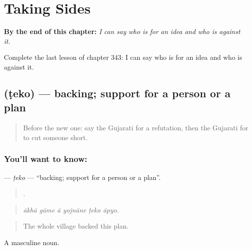 
\chapter{Taking Sides}
\label{ch:gu-taking-sides}

\begin{chapteropening}
\textbf{By the end of this chapter:} \emph{I can say who is for an idea and who is against it.}

Complete the last lesson of chapter 343: I can say who is for an idea and who is against it.
\end{chapteropening}

\section[\texorpdfstring{\gu{ટેકો} (ṭeko)}{ટેકો (ṭeko)}]{ (ṭeko) — backing; support for a person or a plan}

\label{lesson:GU-C343-teko}



\begin{quote}
Before the new one: say the Gujarati for a refutation, then the Gujarati for to cut someone short.
\end{quote}

\subsection*{You'll want to know: }
\textbf{} — \emph{ṭeko} — \textquotedblleft{}backing; support for a person or a plan\textquotedblright{}.

\begin{quote}
     .
\end{quote}

\begin{quote}
\emph{ākhā gāme ā yojnāne ṭeko āpyo.}
\end{quote}

\begin{quote}
The whole village backed this plan.
\end{quote}

A masculine noun.

